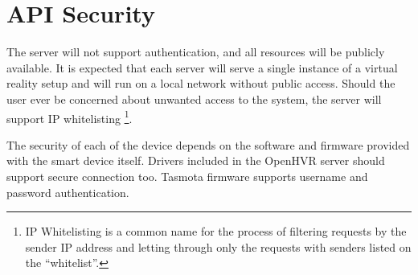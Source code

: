 \hypertarget{x-api-security}{\section{API Security}}
The server will not support authentication, and all resources will be publicly
available. It is expected that each server will serve a single instance of
a virtual reality setup and will run on a local network without public access.
Should the user ever be concerned about unwanted access to the system, the server
will support IP whitelisting
\footnote{IP Whitelisting is a common name for the process of filtering requests by the sender IP address and letting through only the requests with senders listed on the ``whitelist''.}.


The security of each of the device depends on the software and firmware provided
with the smart device itself. Drivers included in the OpenHVR server should
support secure connection too. Tasmota firmware supports username and
password authentication.
